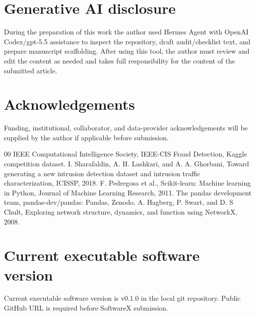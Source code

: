 \documentclass[preprint,12pt,a4paper]{elsarticle}
\begin{document}
\section*{Generative AI disclosure}
During the preparation of this work the author used Hermes Agent with OpenAI Codex/gpt-5.5 assistance to inspect the repository, draft audit/checklist text, and prepare manuscript scaffolding. After using this tool, the author must review and edit the content as needed and takes full responsibility for the content of the submitted article.

\section*{Acknowledgements}
Funding, institutional, collaborator, and data-provider acknowledgements will be supplied by the author if applicable before submission.

\begin{thebibliography}{00}
 IEEE Computational Intelligence Society, IEEE-CIS Fraud Detection, Kaggle competition dataset.
 I. Sharafaldin, A. H. Lashkari, and A. A. Ghorbani, Toward generating a new intrusion detection dataset and intrusion traffic characterization, ICISSP, 2018.
 F. Pedregosa et al., Scikit-learn: Machine learning in Python, Journal of Machine Learning Research, 2011.
 The pandas development team, pandas-dev/pandas: Pandas, Zenodo.
 A. Hagberg, P. Swart, and D. S Chult, Exploring network structure, dynamics, and function using NetworkX, 2008.
\end{thebibliography}

\section*{Current executable software version}
Current executable software version is v0.1.0 in the local git repository. Public GitHub URL is required before SoftwareX submission.
\end{document}
